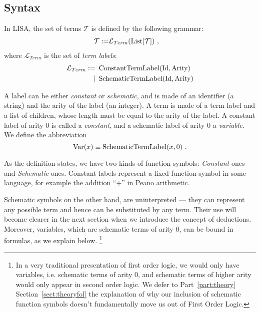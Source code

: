 \subsection{Syntax}
\begin{defin}[Terms]
  In LISA, the set of terms $\mathcal{T}$ is defined by the following grammar:
  \begin{align}
    \mathcal{T} := & \mathcal{L}_{Term}(\operatorname{List}[\mathcal{T}])~,
  \end{align}
  where $\mathcal{L}_{Term}$ is the set of \textit{term labels}:
  \begin{align}
    \mathcal{L}_{Term} := & ~\operatorname{ConstantTermLabel}(\textnormal{Id}, \textnormal{Arity})  \\
    \mid                  & ~\operatorname{SchematicTermLabel}(\textnormal{Id}, \textnormal{Arity})
  \end{align}

  A label can be either \textit{constant} or \textit{schematic}, and is made of an identifier (a string) and the arity of the label (an integer).
  A term is made of a term label and a list of children, whose length must be equal to the arity of the label.
  A constant label of arity $0$ is called a \emph{constant}, and a schematic label of arity $0$ a \emph{variable}.
  We define the abbreviation
  $$
    \operatorname{Var}(x) \equiv \operatorname{SchematicTermLabel}(x, 0)~.
  $$
\end{defin}

As the definition states, we have two kinds of function symbols: \textit{Constant} ones and \textit{Schematic} ones. Constant labels represent a fixed function symbol in some language, for example the addition ``+'' in Peano arithmetic.

Schematic symbols on the other hand, are uninterpreted --- they can represent any possible term and hence can be substituted by any term. Their use will become clearer in the next section when we introduce the concept of deductions.  Moreover, variables, which are schematic terms of arity 0, can be bound in formulas, as we explain below. \footnote{In a very traditional presentation of first order logic, we would only have variables, i.e. schematic terms of arity 0, and schematic terms of higher arity would only appear in second order logic. We defer to Part~\ref{part:theory} Section~\ref{sect:theoryfol} the explanation of why our inclusion of schematic function symbols doesn't fundamentally move us out of First Order Logic.}


